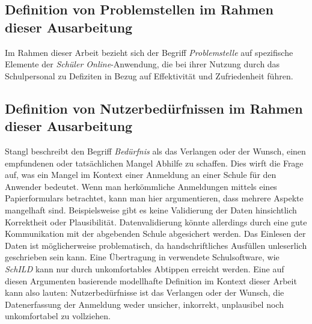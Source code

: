 \subsection{Definition von Problemstellen im Rahmen dieser Ausarbeitung}
Im Rahmen dieser Arbeit bezieht sich der Begriff \textit{Problemstelle} auf spezifische Elemente der \textit{Schüler Online}-Anwendung, die bei ihrer Nutzung durch das Schulpersonal zu Defiziten in Bezug auf Effektivität und Zufriedenheit führen.

\subsection{Definition von Nutzerbedürfnissen im Rahmen dieser Ausarbeitung}
Stangl beschreibt den Begriff \textit{Bedürfnis} als \glqq das Verlangen oder der Wunsch, einen empfundenen oder tatsächlichen Mangel Abhilfe zu schaffen.\grqq{}\cite{stangl-beduerfnis} Dies wirft die Frage auf, was ein Mangel im Kontext einer Anmeldung an einer Schule für den Anwender bedeutet. Wenn man herkömmliche Anmeldungen mittels eines Papierformulars betrachtet, kann man hier argumentieren, dass mehrere Aspekte mangelhaft sind. Beispielsweise gibt es keine Validierung der Daten hinsichtlich Korrektheit oder Plausibilität.  Datenvalidierung könnte allerdings durch eine gute Kommunikation mit der abgebenden Schule abgesichert werden. Das Einlesen der Daten ist möglicherweise problematisch, da handschriftliches Ausfüllen unleserlich geschrieben sein kann. Eine Übertragung in verwendete Schulsoftware, wie \textit{SchILD} kann nur durch unkomfortables Abtippen erreicht werden.
Eine auf diesen Argumenten basierende modellhafte Definition im Kontext dieser Arbeit kann also lauten: \glqq Nutzerbedürfnisse ist das Verlangen oder der Wunsch, die Datenerfassung der Anmeldung weder unsicher, inkorrekt, unplausibel noch unkomfortabel zu vollziehen\grqq{}.

